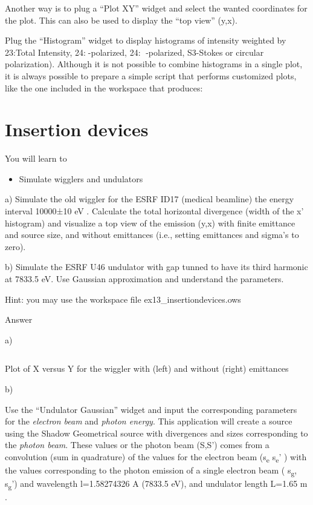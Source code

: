 \documentclass[]{article}
\providecommand{\tightlist}{%
  \setlength{\itemsep}{0pt}\setlength{\parskip}{0pt}}
\begin{document}
Another way is to plug a ``Plot XY'' widget and select the wanted
coordinates for the plot. This can also be used to display the ``top
view'' (y,x).

Plug the ``Histogram'' widget to display histograms of intensity
weighted by 23:Total Intensity, 24:-polarized, 24: -polarized,
S3-Stokes or circular polarization). Although it is not possible to
combine histograms in a single plot, it is always possible to prepare a
simple script that performs customized plots, like the one included in
the workspace that produces:

\section{Insertion devices}\label{insertion-devices}

You will learn to

\begin{itemize}
\tightlist
\item
  Simulate wigglers and undulators
\end{itemize}

a) Simulate the old wiggler for the ESRF ID17 (medical beamline) the
energy interval 10000±10 eV . Calculate the total horizontal divergence
(width of the x' histogram) and visualize a top view of the emission
(y,x) with finite emittance and source size, and without emittances
(i.e., setting emittances and sigma's to zero).

b) Simulate the ESRF U46 undulator with gap tunned to have its third
harmonic at 7833.5 eV. Use Gaussian approximation and understand the
parameters.

Hint: you may use the workspace file ex13\_insertiondevices.ows

Answer

a)

\begin{longtable}[]{@{}@{}}
\toprule
\tabularnewline
\tabularnewline
\bottomrule
\end{longtable}

Plot of X versus Y for the wiggler with (left) and without (right)
emittances

b)

Use the ``Undulator Gaussian'' widget and input the corresponding
parameters for the \emph{electron beam} and \emph{photon energy}. This
application will create a source using the Shadow Geometrical source
with divergences and sizes corresponding to the \emph{photon beam}.
These values or the photon beam (S,S') comes from a convolution (sum in
quadrature) of the values for the electron beam (s\textsubscript{e
}s\textsubscript{e}' ) with the values corresponding to the photon
emission of a single electron beam ( s\textsubscript{g},
s\textsubscript{g}') and wavelength l=1.58274326 A (7833.5 eV), and
undulator length L=1.65 m .
\end{document}
